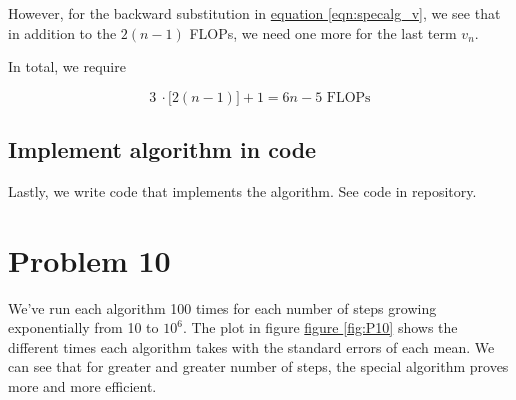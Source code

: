 \documentclass[english,notitlepage]{article}  %
\begin{document}
    However, for the backward substitution in \hyperref[eqn:specalg_v]{equation \ref*{eqn:specalg_v}}, we see that in addition to the $2(n-1)$ FLOPs, we need one more for the last term $v_n$.

    In total, we require

    \begin{equation}
      3 ~ \cdotp \big[ 2(n-1)\big] + 1 = 6n-5 \text{ FLOPs}
    \end{equation}

    \subsection*{Implement algorithm in code}

    Lastly, we write code that implements the algorithm. See code in repository.

\section*{Problem 10}
    

We've run each algorithm 100 times for each number of steps growing exponentially from 10 to $10^6$. The plot in figure \hyperref[fig:P10]{figure \ref*{fig:P10}} shows the different times each algorithm takes with the standard errors of each mean. We can see that for greater and greater number of steps, the special algorithm proves more and more efficient.
\end{document}
